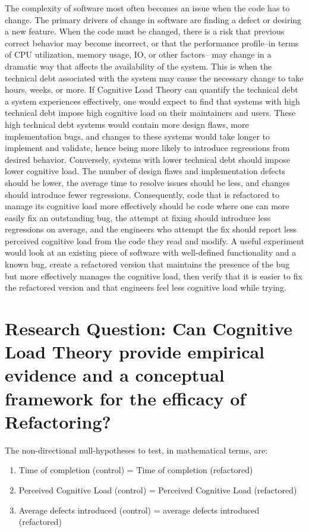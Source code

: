 The complexity of software most often becomes an issue when the code has to change. The primary drivers of change in software are finding a defect or desiring a new feature. When the code must be changed, there is a risk that previous correct behavior may become incorrect, or that the performance profile--in terms of CPU utilization, memory usage, IO, or other factors-- may change in a dramatic way that affects the availability of the system. This is when the technical debt associated with the system may cause the necessary change to take hours, weeks, or more. If Cognitive Load Theory can quantify the technical debt a system experiences effectively, one would expect to find that systems with high technical debt impose high cognitive load on their maintainers and users. These high technical debt systems would contain more design flaws, more implementation bugs, and changes to these systems would take longer to implement and validate, hence being more likely to introduce regressions from desired behavior. Conversely, systems with lower technical debt should impose lower cognitive load. The number of design flaws and implementation defects should be lower, the average time to resolve issues should be less, and changes should introduce fewer regressions. Consequently, code that is refactored to manage its cognitive load more effectively should be code where one can more easily fix an outstanding bug, the attempt at fixing should introduce less regressions on average, and the engineers who attempt the fix should report less perceived cognitive load from the code they read and modify. A useful experiment would look at an existing piece of software with well-defined functionality and a known bug, create a refactored version that maintains the presence of the bug but more effectively manages the cognitive load, then verify that it is easier to fix the refactored version and that engineers feel less cognitive load while trying.

\section{Research Question: Can Cognitive Load Theory provide empirical evidence and a conceptual framework for the efficacy of Refactoring?}

The non-directional null-hypotheses to test, in mathematical terms, are:
\begin{enumerate}
	\item Time of completion (control) = Time of completion (refactored)
	\item Perceived Cognitive Load (control) = Perceived Cognitive Load (refactored)
	\item Average defects introduced (control) = average defects introduced (refactored)
\end{enumerate}

